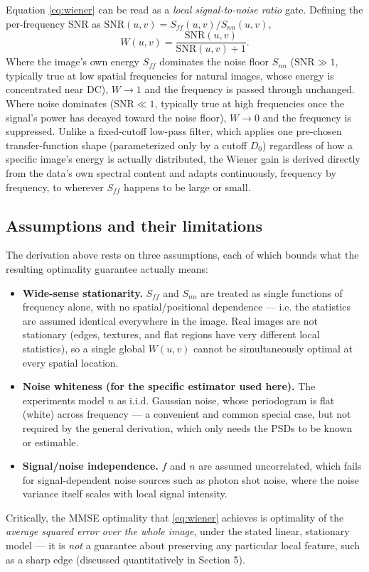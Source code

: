 \documentclass[11pt]{article}
\begin{document}
Equation \eqref{eq:wiener} can be read as a \emph{local signal-to-noise ratio} gate. Defining
the per-frequency SNR as $\mathrm{SNR}(u,v) = S_{ff}(u,v)/S_{nn}(u,v)$,
\[
W(u,v) = \frac{\mathrm{SNR}(u,v)}{\mathrm{SNR}(u,v)+1}.
\]
Where the image's own energy $S_{ff}$ dominates the noise floor $S_{nn}$ ($\mathrm{SNR}\gg1$,
typically true at low spatial frequencies for natural images, whose energy is concentrated
near DC), $W\to 1$ and the frequency is passed through unchanged. Where noise dominates
($\mathrm{SNR}\ll1$, typically true at high frequencies once the signal's power has decayed
toward the noise floor), $W\to 0$ and the frequency is suppressed. Unlike a fixed-cutoff
low-pass filter, which applies one pre-chosen transfer-function shape (parameterized only by
a cutoff $D_0$) regardless of how a specific image's energy is actually distributed, the
Wiener gain is derived directly from the data's own spectral content and adapts continuously,
frequency by frequency, to wherever $S_{ff}$ happens to be large or small.

\subsection{Assumptions and their limitations}

The derivation above rests on three assumptions, each of which bounds what the resulting
optimality guarantee actually means:
\begin{itemize}
\item \textbf{Wide-sense stationarity.} $S_{ff}$ and $S_{nn}$ are treated as single functions
of frequency alone, with no spatial/positional dependence — i.e. the statistics are assumed
identical everywhere in the image. Real images are not stationary (edges, textures, and flat
regions have very different local statistics), so a single global $W(u,v)$ cannot be
simultaneously optimal at every spatial location.
\item \textbf{Noise whiteness (for the specific estimator used here).} The experiments model
$n$ as i.i.d. Gaussian noise, whose periodogram is flat (white) across frequency — a convenient
and common special case, but not required by the general derivation, which only needs the PSDs
to be known or estimable.
\item \textbf{Signal/noise independence.} $f$ and $n$ are assumed uncorrelated, which fails for
signal-dependent noise sources such as photon shot noise, where the noise variance itself
scales with local signal intensity.
\end{itemize}
Critically, the MMSE optimality that \eqref{eq:wiener} achieves is optimality of the
\emph{average squared error over the whole image}, under the stated linear, stationary model —
it is \emph{not} a guarantee about preserving any particular local feature, such as a sharp
edge (discussed quantitatively in Section 5).
\end{document}
